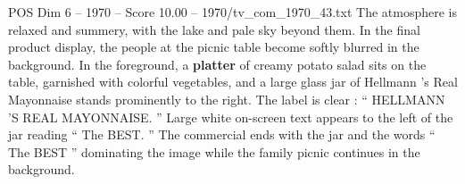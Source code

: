 \begin{textsample}{POS Dim 6 – 1970 – Score 10.00 – 1970/tv\_com\_1970\_43.txt}
The atmosphere is relaxed and summery, with the lake and pale sky beyond them.
In the final product display, the people at the picnic table become softly blurred in the background.
In the foreground, a \textbf{platter} of creamy potato salad sits on the table, garnished with colorful vegetables, and a large glass jar of Hellmann ’s Real Mayonnaise stands prominently to the right.
The label is clear : “ HELLMANN ’S REAL MAYONNAISE. ” Large white on-screen text appears to the left of the jar reading “ The BEST. ” The commercial ends with the jar and the words “ The BEST ” dominating the image while the family picnic continues in the background.

\end{textsample}
